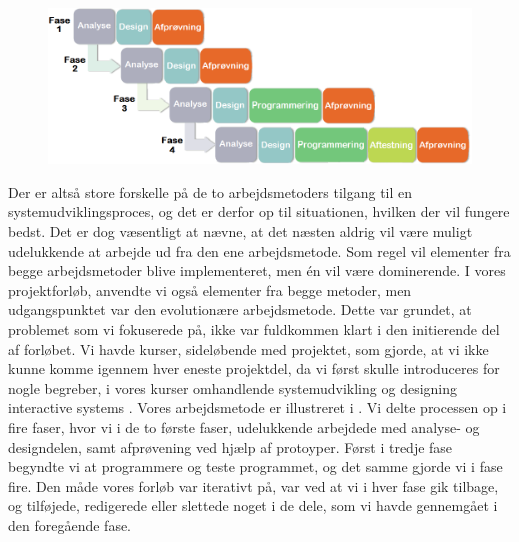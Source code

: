 \begin{figure}[ht]
	\centering
	\includegraphics[scale=0.5]{billeder/blandingsmetode.png}
  	\label{fig:blandingsmetode}
\end{figure}

Der er altså store forskelle på de to arbejdsmetoders tilgang til en systemudviklingsproces, og det er derfor op til situationen, hvilken der vil fungere bedst. Det er dog væsentligt at nævne, at det næsten aldrig vil være muligt udelukkende at arbejde ud fra den ene arbejdsmetode. Som regel vil elementer fra begge arbejdsmetoder blive implementeret, men én vil være dominerende. I vores projektforløb, anvendte vi også elementer fra begge metoder, men udgangspunktet var den evolutionære arbejdsmetode. Dette var grundet, at problemet som vi fokuserede på, ikke var fuldkommen klart i den initierende del af forløbet. Vi havde kurser, sideløbende med projektet, som gjorde, at vi ikke kunne komme igennem hver eneste projektdel, da vi først skulle introduceres for nogle begreber, i vores kurser omhandlende systemudvikling \cite{ooad} og designing interactive systems \cite{deb}. Vores arbejdsmetode er illustreret i . Vi delte processen op i fire faser, hvor vi i de to første faser, udelukkende arbejdede med analyse- og designdelen, samt afprøvening ved hjælp af protoyper. Først i tredje fase begyndte vi at programmere og teste programmet, og det samme gjorde vi i fase fire. Den måde vores forløb var iterativt på, var ved at vi i hver fase gik tilbage, og tilføjede, redigerede eller slettede noget i de dele, som vi havde gennemgået i den foregående fase.

